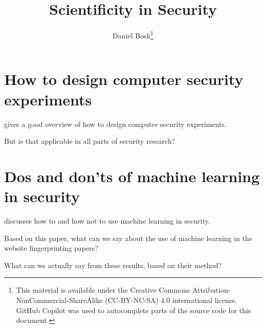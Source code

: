 \title{%
  Scientificity in Security
}
\author{Daniel Bosk\thanks{%
    This material is available under the Creative Commons 
    Attribution-NonCommercial-ShareAlike (CC-BY-NC-SA) 4.0 international 
    license.
    GitHub Copilot was used to autocomplete parts of the source code for this 
    document.
}}

\begin{frame}
  \maketitle
\end{frame}

\mode*

\begin{abstract}
  
\end{abstract}

\clearpage


\section{How to design computer security experiments}

\Textcite{HowToDesignComputerSecurityExperiments} gives a good overview of how 
to design computer security experiments.
\begin{frame}
  \begin{question}
    But is that applicable in all parts of security research?
  \end{question}
\end{frame}

\section{Dos and don'ts of machine learning in security}

\Textcite{DosAndDontsML} discusses how to and how not to use machine learning 
in security.

\begin{frame}
  \begin{question}
    Based on this paper, what can we say about the use of machine learning in 
    the website fingerprinting papers?
  \end{question}
\end{frame}

\begin{frame}
  \begin{question}
    What can we actually say from these results, based on their method?
  \end{question}
\end{frame}

